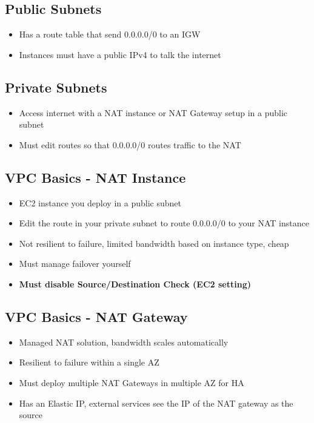 \subsection{Public Subnets}
\begin{itemize}
    \item Has a route table that send 0.0.0.0/0 to an IGW
    \item Instances must have a public IPv4 to talk the internet
\end{itemize}

\subsection{Private Subnets}
\begin{itemize}
    \item Access internet with a NAT instance or NAT Gateway setup in a public subnet
    \item Must edit routes so that 0.0.0.0/0 routes traffic to the NAT
\end{itemize}

\subsection{VPC Basics - NAT Instance}
\begin{itemize}
    \item EC2 instance you deploy in a public subnet
    \item Edit the route in your private subnet to route 0.0.0.0/0 to your NAT instance
    \item Not resilient to failure, limited bandwidth based on instance type, cheap
    \item Must manage failover yourself
    \item \textbf{Must disable Source/Destination Check (EC2 setting)}
\end{itemize}

\subsection{VPC Basics - NAT Gateway}
\begin{itemize}
    \item Managed NAT solution, bandwidth scales automatically
    \item Resilient to failure within a single AZ
    \item Must deploy multiple NAT Gateways in multiple AZ for HA
    \item Has an Elastic IP, external services see the IP of the NAT gateway as the source
\end{itemize}

